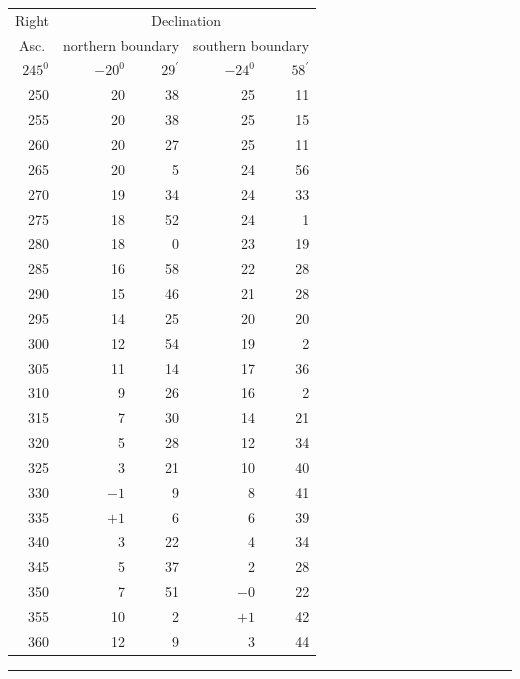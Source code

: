 \begin{center}
\begin{tabular}{|r|r@{\;}r|r@{\;}r|}
\multicolumn{1}{|c|}{Right}&\multicolumn{4}{c|}{Declination}\\
\multicolumn{1}{|c|}{Asc.}&\multicolumn{2}{c|}{northern boundary}&\multicolumn{2}{c|}{southern boundary}\\
\(245^{0}\)&\(-20^{0}\)&\(29^{\prime}\)&\(-24^{0}\)&\(58^{\prime}\)\\
250&20&38&25&11\\
255&20&38&25&15\\
260&20&27&25&11\\
265&20&5&24&56\\
270&19&34&24&33\\
275&18&52&24&1\\
280&18&0&23&19\\
285&16&58&22&28\\
290&15&46&21&28\\
295&14&25&20&20\\
300&12&54&19&2\\
305&11&14&17&36\\
310&9&26&16&2\\
315&7&30&14&21\\
320&5&28&12&34\\
325&3&21&10&40\\
330&\(-1\)&9&8&41\\
335&\(+1\)&6&6&39\\
340&3&22&4&34\\
345&5&37&2&28\\
350&7&51&\(-0\)&22\\
355&10&2&\(+1\)&42\\
360&12&9&3&44\\\hline
\end{tabular}
\end{center}
\endgroup
\par\medskip\begin{center}\rule{.22\textwidth}{.3pt}\end{center}
